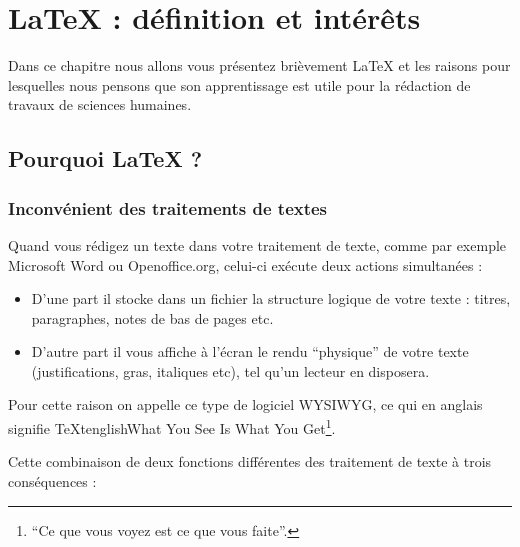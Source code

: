 \chapter{\LaTeX{} : définition et intérêts}

\begin{prealable}
 Dans ce chapitre nous allons vous présentez brièvement \LaTeX{} et les raisons pour lesquelles nous pensons que son apprentissage est utile pour la rédaction de travaux de sciences humaines.
\end{prealable}

\section{Pourquoi \LaTeX{} ?}

\subsection{Inconvénient des traitements de textes}

Quand vous rédigez un texte dans votre traitement de texte, comme par exemple Microsoft Word ou Openoffice.org, celui-ci exécute deux actions simultanées :

\begin{itemize}
\item D'une part il stocke dans un fichier la structure logique de votre texte : titres, paragraphes, notes de bas de pages etc.
\item D'autre part il vous affiche à l'écran le rendu \enquote{physique} de votre texte (justifications, gras, italiques etc), tel qu'un lecteur en disposera.
\end{itemize}

Pour cette raison on appelle ce type de logiciel WYSIWYG, ce qui en anglais signifie \TeX{}tenglish{What You See Is What You Get}\footnote{\enquote{Ce que vous voyez est ce que vous faite}.}. 

Cette combinaison de deux fonctions différentes des traitement de texte à trois conséquences :

